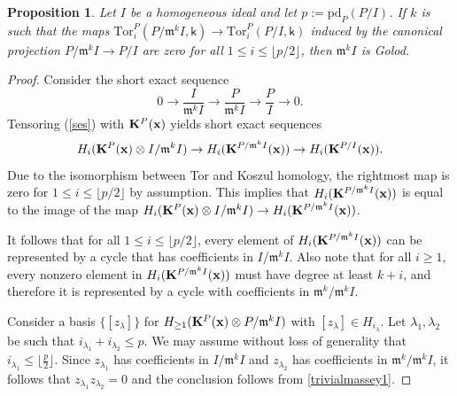 \documentclass[10pt,reqno]{amsart}
\newtheorem{proposition}[subsection]{Proposition}
\theoremstyle{definition}
\theoremstyle{remark}
\numberwithin{equation}{section}
\newcommand{\kk}{\mathsf k}
\newcommand{\m}{\mathfrak m}
\newcommand{\nt}[2][$^\spadesuit$]{\hspace{0pt}#1\marginpar{\tt\raggedleft
    #1 #2}}
\newcommand{\dinesh}[2][$^\heartsuit$]{\nt[#1]{DL:#2}}
\numberwithin{equation}{section}
\begin{document}
\begin{proposition}\label{tor zero}
Let $I$ be a homogeneous ideal and let $p:=\mathrm{pd}_P(P/I)$. If $k$ is such that 
the maps $\mathrm{Tor}_i^P(P/\m^kI, \kk)\to \mathrm{Tor}_i^P(P/I, \kk)$ induced by the canonical projection $P/\m^kI\to P/I$ are zero for all $1\le i \le \lfloor p/2\rfloor$, then $\m^kI$ is Golod. 
\end{proposition}
\begin{proof}
Consider the short exact sequence 
\begin{equation}\label{ses}
0\to \frac{I}{\m^k I} \to \frac{P}{\m^kI}\to \frac{P}{I}\to 0.
\end{equation}
 Tensoring (\ref{ses}) with ${\bf K}^P({\bf x})$ yields short exact sequences
$$
H_i({\bf K}^P({\bf x})\otimes I/\m^k I) \to H_i({\bf K}^{P/\m^kI}({\bf x}))\to H_i({\bf K}^{P/I}({\bf x})).
$$
Due to the isomorphism between Tor and Koszul homology, the rightmost map is zero for $1\le i \le \lfloor p/2 \rfloor$ by assumption. This implies that $H_i({\bf K}^{P/\m^kI}({\bf x}))$ is equal to the image of the map 
$H_i({\bf K}^P({\bf x})\otimes I/\m^kI)\to H_i({\bf K}^{P/\m^kI}({\bf x}))$. 


It follows that for all $1\le i\le \lfloor p/2 \rfloor$, every element of $H_i({\bf K}^{P/\m^kI}({\bf x}))$ can be represented by a cycle that has coefficients in $I/\m^kI$.
Also note that for all $i\ge 1$, every nonzero element in $H_i({\bf K}^{P/\m^kI}({\bf x}))$ must have degree at least $k+i$, and therefore it is represented by a cycle with coefficients in $\m^k/\m^kI$. 
    
    Consider a basis $\{[z_{\lambda}]\}$ for $H_{\ge 1}({\bf K}^P({\bf x})\otimes P/\m^kI)$ with $[z_{\lambda}]\in H_{i_{\lambda}}$. 
    Let $\lambda_1, \lambda_2$ be such that $i_{\lambda_1}+i_{\lambda_2}\le p$. 
 We may assume without loss of generality that $i_{\lambda_1}\le \lfloor \frac{p}{2}\rfloor.$
 Since $z_{\lambda_1}$ has coefficients in $I/\m^kI$ and $z_{\lambda_2}$ has coefficients in $\m^k/\m^kI$, it follows that $z_{\lambda_1}z_{\lambda_2}=0$ and the conclusion follows from
\cref{trivialmassey1}.
\end{proof}
\end{document}
